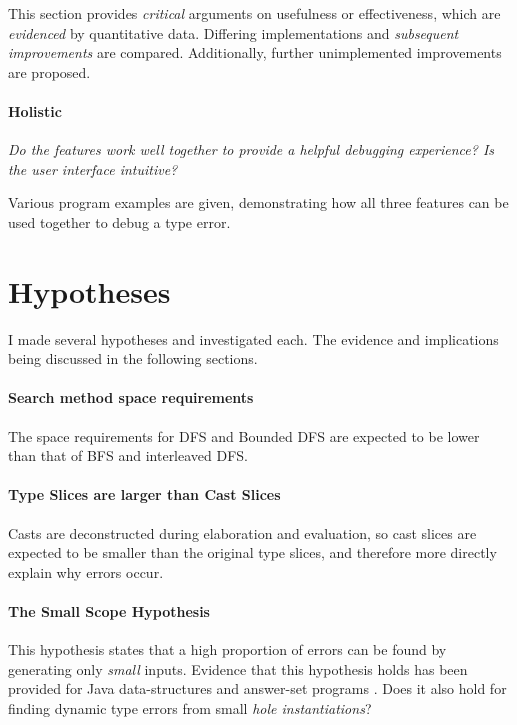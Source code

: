 This section provides \textit{critical} arguments on {usefulness} or {effectiveness}, which are \textit{evidenced} by quantitative data. Differing implementations and \textit{subsequent improvements} are compared. Additionally, further unimplemented improvements are proposed.

\paragraph{Holistic} \textit{Do the features work well together to provide a helpful debugging experience? Is the user interface intuitive?}

Various program examples are given, demonstrating how all three features can be used together to debug a type error.



\section{Hypotheses}
I made several hypotheses and investigated each. The evidence and implications being discussed in the following sections.

\paragraph{Search method space requirements} The space requirements for DFS and Bounded DFS are expected to be lower than that of BFS and interleaved DFS.

\paragraph{Type Slices are larger than Cast Slices} Casts are deconstructed during elaboration and evaluation, so cast slices are expected to be smaller than the original type slices, and therefore more directly explain why errors occur. 

\paragraph{The Small Scope Hypothesis}
\label{sec:SmallScopeHypothesis} This hypothesis \cite{SmallScopeHypothesisOrigination} states that a high proportion of errors can be found by generating only \textit{small} inputs. Evidence that this hypothesis holds has been provided for Java data-structures \cite{SmallScopeHypothesis} and answer-set programs \cite{SmallScopeHypothesisAnswerSet}. Does it also hold for finding dynamic type errors from small \textit{hole instantiations}?

